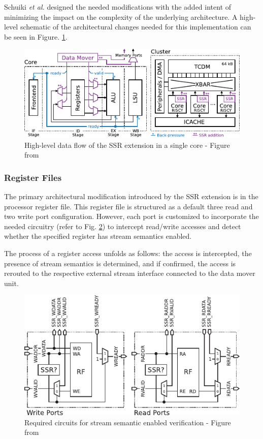 Schuiki \textit{et al.} \cite{9068465} designed the needed modifications with the added intent of minimizing the impact on the complexity of the underlying architecture. A high-level schematic of the architectural changes needed for this implementation can be seen in Figure. \ref{fig:ssr-overview}.

\begin{figure}[H]
	\begin{center}
 		\includegraphics[width=0.87\linewidth]{images/ssr-overview.pdf}
 		\caption{High-level data flow of the SSR extension in a single core  - Figure from \cite{9068465}}
 		\label{fig:ssr-overview}
	\end{center} 
\end{figure}

\subsubsection{Register Files}

The primary architectural modification introduced by the SSR extension is in the processor register file. This register file is structured as a default three read and two write port configuration. However, each port is customized to incorporate the needed circuitry (refer to Fig. \ref{fig:ssr-stream_enable_check}) to intercept read/write accesses and detect whether the specified register has stream semantics enabled.

The process of a register access unfolds as follows: the access is intercepted, the presence of stream semantics is determined, and if confirmed, the access is rerouted to the respective external stream interface connected to the data mover unit.

\begin{figure}[H]
	\begin{center}
 		\includegraphics[width=0.67\linewidth]{images/ssr-circuitry.pdf}
 		\caption{Required circuits for stream semantic enabled verification  - Figure from \cite{9068465}}
 		\label{fig:ssr-stream_enable_check}
	\end{center} 
\end{figure}

